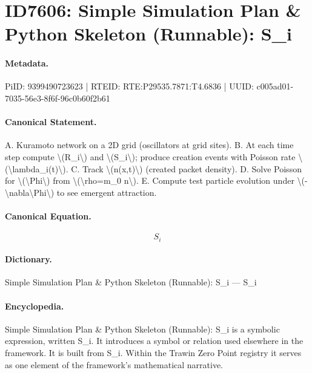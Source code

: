 \section*{ID7606: Simple Simulation Plan \& Python Skeleton (Runnable): S\_i}
\paragraph{Metadata.}
PiID: 9399490723623 | RTEID: RTE:P29535.7871:T4.6836 | UUID: c005ad01-7035-56e3-8f6f-96c0b60f2b61

\paragraph{Canonical Statement.}
A. Kuramoto network on a 2D grid (oscillators at grid sites). B. At each time step compute \textbackslash{}(R\_i\textbackslash{}) and \textbackslash{}(S\_i\textbackslash{}); produce creation events with Poisson rate \textbackslash{}(\textbackslash{}lambda\_i(t)\textbackslash{}). C. Track \textbackslash{}(n(x,t)\textbackslash{}) (created packet density). D. Solve Poisson for \textbackslash{}(\textbackslash{}Phi\textbackslash{}) from \textbackslash{}(\textbackslash{}rho=m\_0 n\textbackslash{}). E. Compute test particle evolution under \textbackslash{}(-\textbackslash{}nabla\textbackslash{}Phi\textbackslash{}) to see emergent attraction.

\paragraph{Canonical Equation.}
\[
S_i
\]

\paragraph{Dictionary.}
Simple Simulation Plan \& Python Skeleton (Runnable): S\_i — S\_i

\paragraph{Encyclopedia.}
Simple Simulation Plan \& Python Skeleton (Runnable): S\_i is a symbolic expression, written S\_i. It introduces a symbol or relation used elsewhere in the framework. It is built from S\_i. Within the Trawin Zero Point registry it serves as one element of the framework's mathematical narrative.
